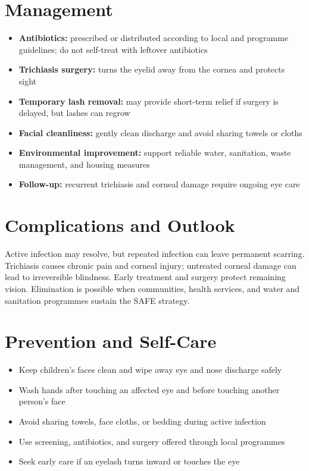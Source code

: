 \section*{Management}
\begin{itemize}
    \item \textbf{Antibiotics:} prescribed or distributed according to local and programme guidelines; do not self-treat with leftover antibiotics
    \item \textbf{Trichiasis surgery:} turns the eyelid away from the cornea and protects sight
    \item \textbf{Temporary lash removal:} may provide short-term relief if surgery is delayed, but lashes can regrow
    \item \textbf{Facial cleanliness:} gently clean discharge and avoid sharing towels or cloths
    \item \textbf{Environmental improvement:} support reliable water, sanitation, waste management, and housing measures
    \item \textbf{Follow-up:} recurrent trichiasis and corneal damage require ongoing eye care
\end{itemize}

\section*{Complications and Outlook}
Active infection may resolve, but repeated infection can leave permanent scarring. Trichiasis causes chronic pain and corneal injury; untreated corneal damage can lead to irreversible blindness. Early treatment and surgery protect remaining vision. Elimination is possible when communities, health services, and water and sanitation programmes sustain the SAFE strategy.

\section*{Prevention and Self-Care}
\begin{itemize}
    \item Keep children's faces clean and wipe away eye and nose discharge safely
    \item Wash hands after touching an affected eye and before touching another person's face
    \item Avoid sharing towels, face cloths, or bedding during active infection
    \item Use screening, antibiotics, and surgery offered through local programmes
    \item Seek early care if an eyelash turns inward or touches the eye
\end{itemize}

